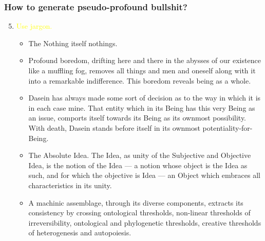 \documentclass[UTF8,aspectratio=43,11pt,colorlinks,compress,openany]{beamer}%
\begin{document}
\begin{frame}\frametitle{How to generate pseudo-profound bullshit?}\vspace{-3pt}
	\begin{enumerate}\setcounter{enumi}{4}
		\item \textcolor{yellow}{Use jargon.}
		\begin{itemize}
			\item The Nothing itself nothings.
			\item Profound boredom, drifting here and there in the abysses of our existence like a muffling fog, removes all things and men and oneself along with it into a remarkable indifference. This boredom reveals being as a whole.
			\item Dasein has always made some sort of decision as to the way in which it is in each case mine. That entity which in its Being has this very Being as an issue, comports itself towards its Being as its ownmost possibility. With death, Dasein stands before itself in its ownmost potentiality-for-Being.
			\item The Absolute Idea. The Idea, as unity of the Subjective and Objective Idea, is the notion of the Idea --- a notion whose object is the Idea as such, and for which the objective is Idea --- an Object which embraces all characteristics in its unity.
			\item A machinic assemblage, through its diverse components, extracts its consistency by crossing ontological thresholds, non-linear thresholds of irreversibility, ontological and phylogenetic thresholds, creative thresholds of heterogenesis and autopoiesis.
		\end{itemize}
	\end{enumerate}
\end{frame}
\end{document}
